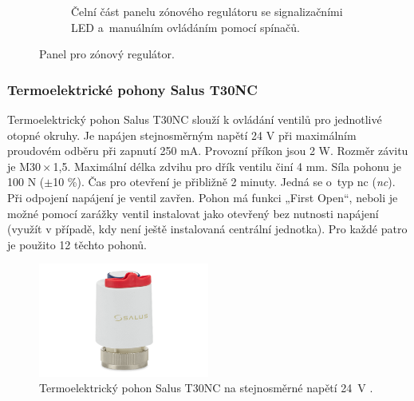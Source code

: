 \begin{figure}[H]
\begin{subfigure}{.5\textwidth}
  \caption[Čelní část panelu zónového regulátoru.]{Čelní část panelu zónového regulátoru se signalizačními LED a~manuálním ovládáním pomocí spínačů.}
    \label{fig:zonovy-regulator-vrchni-strana}
\end{subfigure}
\caption{Panel pro zónový regulátor.}
\label{fig:zonovy-regulator}
\end{figure}

\subsubsection{Termoelektrické pohony Salus T30NC}  
Termoelektrický pohon Salus T30NC \cite{termoelektricky-pohon-t30nc} slouží k ovládání ventilů pro jednotlivé otopné okruhy. Je napájen stejnosměrným napětí 24 V při maximálním proudovém odběru při zapnutí 250 mA. Provozní příkon jsou 2 W. Rozměr závitu je M30\,×\,1,5. Maximální délka zdvihu pro dřík ventilu činí 4 mm. Síla pohonu je 100 N ($\pm$10 \%). Čas pro otevření je přibližně 2 minuty. Jedná se o~typ \acrshort{nc} (\textit{\acrlong{nc}}). Při odpojení napájení je ventil zavřen. Pohon má funkci „First Open“, neboli je možné pomocí zarážky ventil instalovat jako otevřený bez nutnosti napájení (využít v případě, kdy není ještě instalovaná centrální jednotka). Pro každé patro je použito 12 těchto pohonů.

\begin{figure}[H]
    \centering
    \includegraphics[width=0.5\textwidth]{images/termoelektricky-pohon-salus-t30nc-24-v.png}
    \caption[Termoelektrický pohon Salus T30NC.]{Termoelektrický pohon Salus T30NC na stejnosměrné napětí 24~V \cite{termoelektricky-pohon-t30nc}.}
    \label{fig:termoelektricky-pohon-salus-t30nc-24-v}
\end{figure}